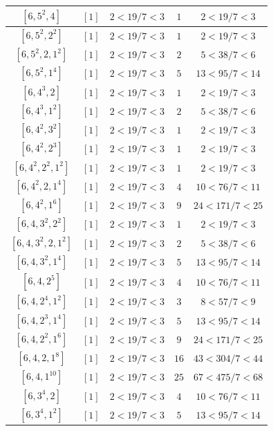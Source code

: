 \documentclass{article}%
\begin{document}
\begin{center}
\begin{longtable}{||c|c|c|c|c||}
$[6, 5^{2}, 4]$ & $[1]$ & $2 < 19/7 < 3$ & $1$ & $2 < 19/7 < 3$ \\ \hline 
$[6, 5^{2}, 2^{2}]$ & $[1]$ & $2 < 19/7 < 3$ & $1$ & $2 < 19/7 < 3$ \\ \hline 
$[6, 5^{2}, 2, 1^{2}]$ & $[1]$ & $2 < 19/7 < 3$ & $2$ & $5 < 38/7 < 6$ \\ \hline 
$[6, 5^{2}, 1^{4}]$ & $[1]$ & $2 < 19/7 < 3$ & $5$ & $13 < 95/7 < 14$ \\ \hline 
$[6, 4^{3}, 2]$ & $[1]$ & $2 < 19/7 < 3$ & $1$ & $2 < 19/7 < 3$ \\ \hline 
$[6, 4^{3}, 1^{2}]$ & $[1]$ & $2 < 19/7 < 3$ & $2$ & $5 < 38/7 < 6$ \\ \hline 
$[6, 4^{2}, 3^{2}]$ & $[1]$ & $2 < 19/7 < 3$ & $1$ & $2 < 19/7 < 3$ \\ \hline 
$[6, 4^{2}, 2^{3}]$ & $[1]$ & $2 < 19/7 < 3$ & $1$ & $2 < 19/7 < 3$ \\ \hline 
$[6, 4^{2}, 2^{2}, 1^{2}]$ & $[1]$ & $2 < 19/7 < 3$ & $1$ & $2 < 19/7 < 3$ \\ \hline 
$[6, 4^{2}, 2, 1^{4}]$ & $[1]$ & $2 < 19/7 < 3$ & $4$ & $10 < 76/7 < 11$ \\ \hline 
$[6, 4^{2}, 1^{6}]$ & $[1]$ & $2 < 19/7 < 3$ & $9$ & $24 < 171/7 < 25$ \\ \hline 
$[6, 4, 3^{2}, 2^{2}]$ & $[1]$ & $2 < 19/7 < 3$ & $1$ & $2 < 19/7 < 3$ \\ \hline 
$[6, 4, 3^{2}, 2, 1^{2}]$ & $[1]$ & $2 < 19/7 < 3$ & $2$ & $5 < 38/7 < 6$ \\ \hline 
$[6, 4, 3^{2}, 1^{4}]$ & $[1]$ & $2 < 19/7 < 3$ & $5$ & $13 < 95/7 < 14$ \\ \hline 
$[6, 4, 2^{5}]$ & $[1]$ & $2 < 19/7 < 3$ & $4$ & $10 < 76/7 < 11$ \\ \hline 
$[6, 4, 2^{4}, 1^{2}]$ & $[1]$ & $2 < 19/7 < 3$ & $3$ & $8 < 57/7 < 9$ \\ \hline 
$[6, 4, 2^{3}, 1^{4}]$ & $[1]$ & $2 < 19/7 < 3$ & $5$ & $13 < 95/7 < 14$ \\ \hline 
$[6, 4, 2^{2}, 1^{6}]$ & $[1]$ & $2 < 19/7 < 3$ & $9$ & $24 < 171/7 < 25$ \\ \hline 
$[6, 4, 2, 1^{8}]$ & $[1]$ & $2 < 19/7 < 3$ & $16$ & $43 < 304/7 < 44$ \\ \hline 
$[6, 4, 1^{10}]$ & $[1]$ & $2 < 19/7 < 3$ & $25$ & $67 < 475/7 < 68$ \\ \hline 
$[6, 3^{4}, 2]$ & $[1]$ & $2 < 19/7 < 3$ & $4$ & $10 < 76/7 < 11$ \\ \hline 
$[6, 3^{4}, 1^{2}]$ & $[1]$ & $2 < 19/7 < 3$ & $5$ & $13 < 95/7 < 14$ \\ \hline 

\end{longtable}
\end{center}
\end{document}
